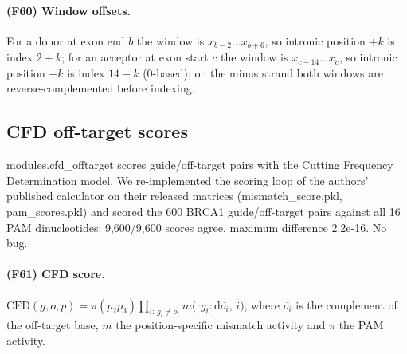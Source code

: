 \paragraph{(F60) Window offsets.} For a donor at exon end $b$ the window is $x_{b-2}\dots x_{b+6}$, so intronic position $+k$ is index $2+k$; for an acceptor at exon start $c$ the window is $x_{c-14}\dots x_{c}$, so intronic position $-k$ is index $14-k$ (0-based); on the minus strand both windows are reverse-complemented before indexing.
\subsection{CFD off-target scores}
modules.cfd\_offtarget scores guide/off-target pairs with the Cutting Frequency Determination model. We re-implemented the scoring loop of the authors' published calculator on their released matrices (mismatch\_score.pkl, pam\_scores.pkl) and scored the 600 BRCA1 guide/off-target pairs against all 16 PAM dinucleotides: 9,600/9,600 scores agree, maximum difference 2.2e-16. No bug.
\paragraph{(F61) CFD score.} $\mathrm{CFD}(g,o,p)=\pi(p_2p_3)\prod_{i:\,g_i\ne o_i} m\big(\mathrm{r}g_i{:}\mathrm{d}\overline{o_i},\,i\big)$, where $\overline{o_i}$ is the complement of the off-target base, $m$ the position-specific mismatch activity and $\pi$ the PAM activity.
